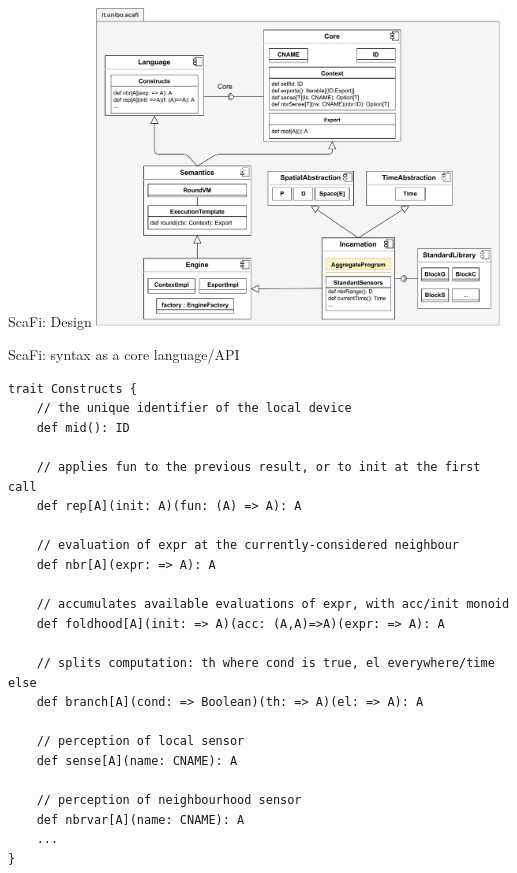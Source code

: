 \documentclass[presentation, 8pt]{beamer}\mode<presentation>{\usetheme{AMSBolognaFC}}
\begin{document}
\begin{frame}{ScaFi: Design}
\centering
\includegraphics[width=0.8\textwidth]{img/scafi-design.drawio.pdf}
\end{frame}
\begin{frame}[fragile]{ScaFi: syntax as a core language/API}

\begin{verbatim}
trait Constructs {
	// the unique identifier of the local device 
	def mid(): ID
	
	// applies fun to the previous result, or to init at the first call
	def rep[A](init: A)(fun: (A) => A): A
	
	// evaluation of expr at the currently-considered neighbour
	def nbr[A](expr: => A): A
	
	// accumulates available evaluations of expr, with acc/init monoid
	def foldhood[A](init: => A)(acc: (A,A)=>A)(expr: => A): A
	
	// splits computation: th where cond is true, el everywhere/time else
	def branch[A](cond: => Boolean)(th: => A)(el: => A): A
	
	// perception of local sensor
	def sense[A](name: CNAME): A
	
	// perception of neighbourhood sensor
	def nbrvar[A](name: CNAME): A
	...
}
\end{verbatim}
\end{frame}
\end{document}
